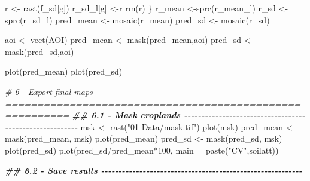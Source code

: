 \documentclass[
  10pt,
  b5paper,
  oneside]{book}
\newenvironment{Shaded}{\begin{snugshade}}{\end{snugshade}}
\newcommand{\AttributeTok}[1]{\textcolor[rgb]{0.77,0.63,0.00}{#1}}
\newcommand{\CommentTok}[1]{\textcolor[rgb]{0.56,0.35,0.01}{\textit{#1}}}
\newcommand{\DecValTok}[1]{\textcolor[rgb]{0.00,0.00,0.81}{#1}}
\newcommand{\DocumentationTok}[1]{\textcolor[rgb]{0.56,0.35,0.01}{\textbf{\textit{#1}}}}
\newcommand{\FunctionTok}[1]{\textcolor[rgb]{0.00,0.00,0.00}{#1}}
\newcommand{\NormalTok}[1]{#1}
\newcommand{\OtherTok}[1]{\textcolor[rgb]{0.56,0.35,0.01}{#1}}
\newcommand{\SpecialCharTok}[1]{\textcolor[rgb]{0.00,0.00,0.00}{#1}}
\newcommand{\StringTok}[1]{\textcolor[rgb]{0.31,0.60,0.02}{#1}}
\begin{document}
\begin{Shaded}
\begin{Highlighting}[]
\NormalTok{  r }\OtherTok{\textless{}{-}} \FunctionTok{rast}\NormalTok{(f\_sd[g])}
\NormalTok{  r\_sd\_l[g] }\OtherTok{\textless{}{-}}\NormalTok{r}
  \FunctionTok{rm}\NormalTok{(r)}
\NormalTok{\}}
\NormalTok{r\_mean }\OtherTok{\textless{}{-}}\FunctionTok{sprc}\NormalTok{(r\_mean\_l)}
\NormalTok{r\_sd }\OtherTok{\textless{}{-}}\FunctionTok{sprc}\NormalTok{(r\_sd\_l)}
\NormalTok{pred\_mean }\OtherTok{\textless{}{-}} \FunctionTok{mosaic}\NormalTok{(r\_mean)}
\NormalTok{pred\_sd }\OtherTok{\textless{}{-}} \FunctionTok{mosaic}\NormalTok{(r\_sd)}

\NormalTok{aoi }\OtherTok{\textless{}{-}} \FunctionTok{vect}\NormalTok{(AOI)}
\NormalTok{pred\_mean }\OtherTok{\textless{}{-}} \FunctionTok{mask}\NormalTok{(pred\_mean,aoi)}
\NormalTok{pred\_sd }\OtherTok{\textless{}{-}} \FunctionTok{mask}\NormalTok{(pred\_sd,aoi)}


\FunctionTok{plot}\NormalTok{(pred\_mean)}
\FunctionTok{plot}\NormalTok{(pred\_sd)}


\CommentTok{\# 6 {-} Export final maps ========================================================}
\DocumentationTok{\#\# 6.1 {-} Mask croplands {-}{-}{-}{-}{-}{-}{-}{-}{-}{-}{-}{-}{-}{-}{-}{-}{-}{-}{-}{-}{-}{-}{-}{-}{-}{-}{-}{-}{-}{-}{-}{-}{-}{-}{-}{-}{-}{-}{-}{-}{-}{-}{-}{-}{-}{-}{-}{-}{-}{-}{-}{-}{-}{-}{-}{-}}
\NormalTok{msk }\OtherTok{\textless{}{-}} \FunctionTok{rast}\NormalTok{(}\StringTok{"01{-}Data/mask.tif"}\NormalTok{)}
\FunctionTok{plot}\NormalTok{(msk)}
\NormalTok{pred\_mean }\OtherTok{\textless{}{-}} \FunctionTok{mask}\NormalTok{(pred\_mean, msk)}
\FunctionTok{plot}\NormalTok{(pred\_mean)}
\NormalTok{pred\_sd }\OtherTok{\textless{}{-}} \FunctionTok{mask}\NormalTok{(pred\_sd, msk)}
\FunctionTok{plot}\NormalTok{(pred\_sd)}
\FunctionTok{plot}\NormalTok{(pred\_sd}\SpecialCharTok{/}\NormalTok{pred\_mean}\SpecialCharTok{*}\DecValTok{100}\NormalTok{, }\AttributeTok{main =} \FunctionTok{paste}\NormalTok{(}\StringTok{"CV"}\NormalTok{,soilatt))}

\DocumentationTok{\#\# 6.2 {-} Save results {-}{-}{-}{-}{-}{-}{-}{-}{-}{-}{-}{-}{-}{-}{-}{-}{-}{-}{-}{-}{-}{-}{-}{-}{-}{-}{-}{-}{-}{-}{-}{-}{-}{-}{-}{-}{-}{-}{-}{-}{-}{-}{-}{-}{-}{-}{-}{-}{-}{-}{-}{-}{-}{-}{-}{-}{-}{-}}


\end{Highlighting}
\end{Shaded}
\end{document}
